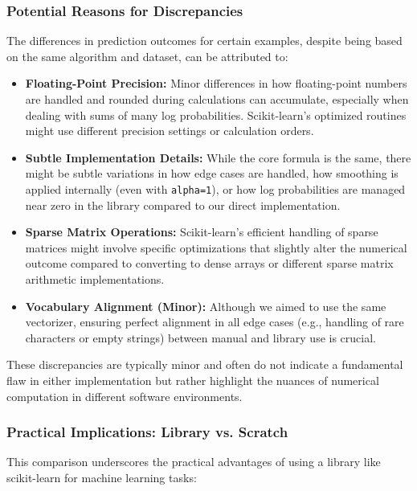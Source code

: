 \documentclass[12pt,a4paper]{article}
\begin{document}
\subsubsection{Potential Reasons for Discrepancies}

The differences in prediction outcomes for certain examples, despite being based on the same algorithm and dataset, can be attributed to:

\begin{itemize}
    \item \textbf{Floating-Point Precision:} Minor differences in how floating-point numbers are handled and rounded during calculations can accumulate, especially when dealing with sums of many log probabilities. Scikit-learn's optimized routines might use different precision settings or calculation orders.
    \item \textbf{Subtle Implementation Details:} While the core formula is the same, there might be subtle variations in how edge cases are handled, how smoothing is applied internally (even with \texttt{alpha=1}), or how log probabilities are managed near zero in the library compared to our direct implementation.
    \item \textbf{Sparse Matrix Operations:} Scikit-learn's efficient handling of sparse matrices might involve specific optimizations that slightly alter the numerical outcome compared to converting to dense arrays or different sparse matrix arithmetic implementations.
    \item \textbf{Vocabulary Alignment (Minor):} Although we aimed to use the same vectorizer, ensuring perfect alignment in all edge cases (e.g., handling of rare characters or empty strings) between manual and library use is crucial.
\end{itemize}

These discrepancies are typically minor and often do not indicate a fundamental flaw in either implementation but rather highlight the nuances of numerical computation in different software environments.

\subsubsection{Practical Implications: Library vs. Scratch}

This comparison underscores the practical advantages of using a library like scikit-learn for machine learning tasks:
\end{document}
